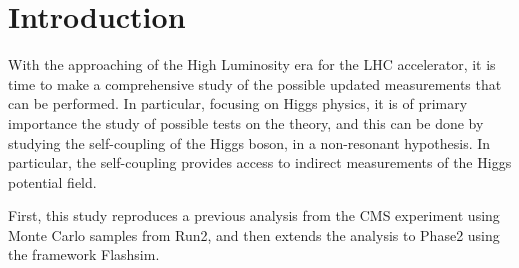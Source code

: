 \chapter*
{Introduction}
\label{chap:chapter_1}

With the approaching of the High Luminosity era for the LHC accelerator, it is time to make a comprehensive study of the possible updated measurements that can be performed. In particular, focusing on Higgs physics, it is of primary importance the study of possible tests on the theory, and this can be done by studying the self-coupling of the Higgs boson, in a non-resonant hypothesis. In particular, the self-coupling provides access to indirect measurements of the Higgs potential field.

First, this study reproduces a previous analysis from the CMS experiment using Monte Carlo samples from Run2, and then extends the analysis to Phase2 using the framework Flashsim.

